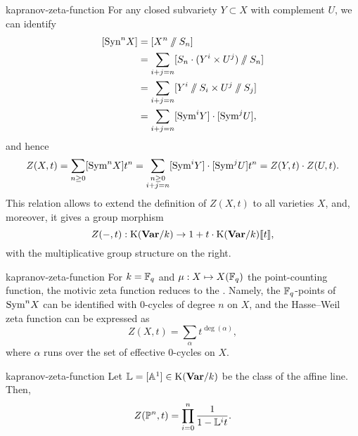 \begin{example}{kapranov-zeta-function}
    For any closed subvariety $Y \subset X$ with complement $U$, we can identify
    \[ \begin{aligned}
        [\textup{Syn}^n X]
            &= [X^n \sslash S_n] \\
            &= \sum_{i + j = n} [S_n \cdot (Y^i \times U^j) \sslash S_n] \\
            &= \sum_{i + j = n} [Y^i \sslash S_i \times U^j \sslash S_j] \\
            &= \sum_{i + j = n} [ \textup{Sym}^i Y] \cdot [ \textup{Sym}^j U ] ,
    \end{aligned} \]
    and hence
    \[ Z(X, t) = \sum_{n \ge 0} [\textup{Sym}^n X] t^n = \sum_{\substack{n \ge 0 \\ i + j = n}} [\textup{Sym}^i Y] \cdot [\textup{Sym}^j U] t^n = Z(Y, t) \cdot Z(U, t) . \]
    This relation allows to extend the definition of $Z(X, t)$ to all varieties $X$, and, moreover, it gives a group morphism
    \[ Z(-, t) : \textup{K}(\textbf{Var}/k) \to 1 + t \cdot \textup{K}(\textbf{Var}/k) \llbracket t \rrbracket , \]
    with the multiplicative group structure on the right.
\end{example}

\begin{example}{kapranov-zeta-function}
    For $k = \FF_q$ and $\mu : X \mapsto X(\FF_q)$ the point-counting function, the motivic zeta function reduces to the . Namely, the $\FF_q$-points of $\textup{Sym}^n X$ can be identified with $0$-cycles of degree $n$ on $X$, and the Hasse--Weil zeta function can be expressed as
    \[ Z(X, t) = \sum_{\alpha} t^{\deg(\alpha)} , \]
    where $\alpha$ runs over the set of effective $0$-cycles on $X$.
\end{example}

\begin{example}{kapranov-zeta-function}
    Let $\mathbb{L} = [\AA^1] \in \textup{K}(\textbf{Var}/k)$ be the class of the affine line. Then,
    \[ Z(\PP^n, t) = \prod_{i = 0}^{n} \frac{1}{1 - \mathbb{L}^i t} . \]
\end{example}

